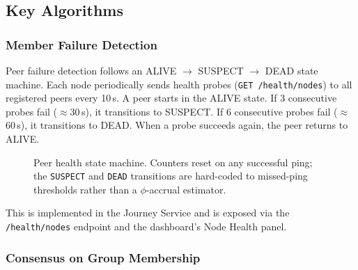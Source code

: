 \documentclass[12pt,a4paper]{article}
\begin{document}
\subsection{Key Algorithms}
 
\subsubsection{Member Failure Detection}
 
Peer failure detection follows an ALIVE $\rightarrow$ SUSPECT $\rightarrow$ DEAD state machine. Each node periodically sends health probes (\texttt{GET /health/nodes}) to all registered peers every 10\,s. A peer starts in the ALIVE state. If 3 consecutive probes fail ($\approx$30\,s), it transitions to SUSPECT. If 6 consecutive probes fail ($\approx$60\,s), it transitions to DEAD. When a probe succeeds again, the peer returns to ALIVE.

\begin{figure}[H]
\centering
{}
\caption{Peer health state machine. Counters reset on any successful
ping; the \texttt{SUSPECT} and \texttt{DEAD} transitions are hard-coded
to missed-ping thresholds rather than a $\phi$-accrual estimator.}
\label{fig:health-sm}
\end{figure}

This is implemented in the Journey Service and is exposed via the \texttt{/health/nodes} endpoint and the dashboard's Node Health panel.
 
\subsubsection{Consensus on Group Membership}
 
\end{document}
